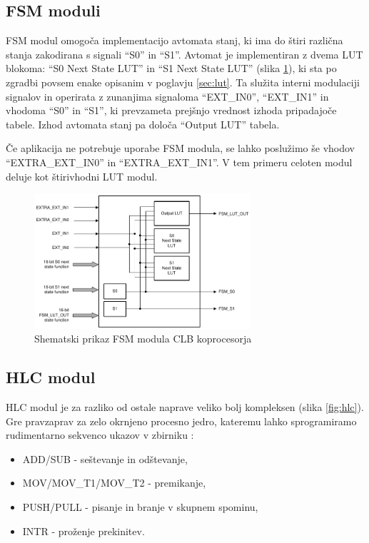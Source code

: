 \documentclass[a4paper]{article}
\begin{document}
\begin{sloppypar}
\subsection{FSM moduli}
FSM modul omogoča implementacijo avtomata stanj, ki ima do štiri različna
stanja zakodirana s signali ``S0'' in ``S1''. Avtomat je implementiran z dvema
LUT blokoma: ``S0 Next State LUT'' in ``S1 Next State LUT'' (slika
\ref{fig:fsm}), ki sta po zgradbi povsem enake opisanim v poglavju
\ref{sec:lut}. Ta služita interni modulaciji signalov in operirata z zunanjima
signaloma ``EXT\_IN0'', ``EXT\_IN1'' in vhodoma ``S0'' in ``S1'', ki prevzameta
prejšnjo vrednost izhoda pripadajoče tabele. Izhod avtomata stanj pa določa
``Output LUT'' tabela.

Če aplikacija ne potrebuje uporabe FSM modula, se lahko poslužimo še vhodov
``EXTRA\_EXT\_IN0'' in ``EXTRA\_EXT\_IN1''. V tem primeru celoten modul deluje
kot štirivhodni LUT modul.

\begin{figure}[htb]
    \centerline{\includegraphics[width=8cm]{shema_fsm}}
    \caption{Shematski prikaz FSM modula CLB koprocesorja
             \cite[Pogl.~26.4.3]{mcu-ref-manual}}
    \label{fig:fsm} 
\end{figure} 

\subsection{HLC modul}\label{sec:hlc}
HLC modul je za razliko od ostale naprave veliko bolj kompleksen (slika
\ref{fig:hlc}).  Gre pravzaprav za zelo okrnjeno procesno jedro, kateremu lahko
sprogramiramo rudimentarno sekvenco ukazov v zbirniku
\cite[Pogl.~26.4.6.2]{mcu-ref-manual}:
\begin{itemize}
    \item ADD/SUB - seštevanje in odštevanje,
    \item MOV/MOV\_T1/MOV\_T2 - premikanje,
    \item PUSH/PULL - pisanje in branje v skupnem spominu,
    \item INTR - proženje prekinitev.
\end{itemize}


\end{sloppypar}
\end{document}
